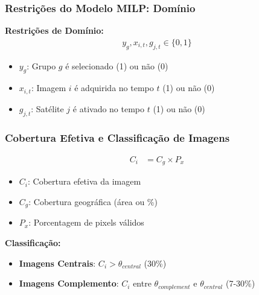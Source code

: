\documentclass{beamer}
\begin{document}
\begin{frame}
    \frametitle{Restrições do Modelo MILP: Domínio}
    
    \textbf{Restrições de Domínio:}
    {\small \begin{align}
        y_g, x_{i,t}, g_{j,t} \in \{0,1\}
    \end{align}}
    \begin{itemize}\setlength{\itemsep}{0pt}\small
        \item $y_g$: Grupo $g$ é selecionado (1) ou não (0)
        \item $x_{i,t}$: Imagem $i$ é adquirida no tempo $t$ (1) ou não (0)
        \item $g_{j,t}$: Satélite $j$ é ativado no tempo $t$ (1) ou não (0)
    \end{itemize}
\end{frame}
\begin{frame}
    \frametitle{Cobertura Efetiva e Classificação de Imagens}
    \begin{align}
    C_i &= C_g \times P_x 
    \end{align}
    
    \begin{itemize}
        \item $C_i$: Cobertura efetiva da imagem
        \item $C_g$: Cobertura geográfica (área ou \%) 
        \item $P_x$: Porcentagem de pixels válidos
    \end{itemize}

    \vspace{0.3cm}
    \textbf{Classificação:}
    \begin{itemize}
        \item \textbf{Imagens Centrais}: $C_i > \theta_{central}$ (30\%)
        \item \textbf{Imagens Complemento}: $C_i$ entre $\theta_{complement}$ e $\theta_{central}$ (7-30\%)
    \end{itemize}
\end{frame}
\end{document}
